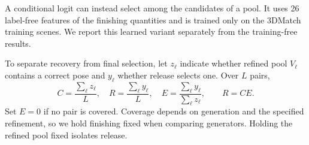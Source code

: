 A conditional logit can instead select among the candidates of a pool. It uses 26 label-free features of the finishing quantities and is trained only on the 3DMatch training scenes. We report this learned variant separately from the training-free results.

\label{sec:diagnosis}
To separate recovery from final selection, let $z_\ell$ indicate whether refined pool $V_\ell$ contains a correct pose and $y_\ell$ whether release selects one. Over $L$ pairs,
\begin{equation}
C=\frac{\sum_\ell z_\ell}{L},\quad R=\frac{\sum_\ell y_\ell}{L},\quad E=\frac{\sum_\ell y_\ell}{\sum_\ell z_\ell},\qquad R=CE.
\label{eq:coverage}
\end{equation}
Set $E=0$ if no pair is covered. Coverage depends on generation and the specified refinement, so we hold finishing fixed when comparing generators. Holding the refined pool fixed isolates release.
